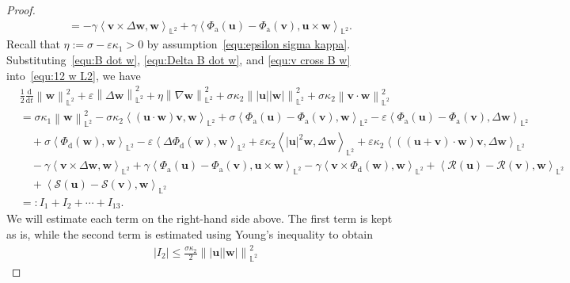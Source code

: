\documentclass[11pt, reqno]{amsart}
\theoremstyle{definition}
\numberwithin{equation}{section}
\newcommand{\bff}{\boldsymbol}
\newcommand{\bb}{\mathbb}
\newcommand{\ddt}{\frac{\mathrm{d}}{\mathrm{d}t}}
\newcommand{\norm}[2]{\left\|{#1}\right\|_{#2}}
\newcommand{\inpro}[2]{\left\langle#1,#2\right\rangle}
\newcommand{\abs}[1]{\left|{#1}\right|}
\begin{document}
\begin{proof}
\begin{align}
    &=
    -\gamma \inpro{\bff{v}\times \Delta \bff{w}}{\bff{w}}_{\bb{L}^2}
    +
    \gamma \inpro{\Phi_{\mathrm{a}}(\bff{u})-\Phi_{\mathrm{a}}(\bff{v})}{\bff{u}\times \bff{w}}_{\bb{L}^2}.
\end{align}
Recall that $\eta:=\sigma-\varepsilon\kappa_1>0$ by assumption~\eqref{equ:epsilon sigma kappa}. Substituting~\eqref{equ:B dot w}, \eqref{equ:Delta B dot w}, and \eqref{equ:v cross B w} into~\eqref{equ:12 w L2}, we have
\begin{align}\label{equ:I1 to I12}
    &\frac12 \ddt \norm{\bff{w}}{\bb{L}^2}^2
    +
    \varepsilon\norm{\Delta \bff{w}}{\bb{L}^2}^2
    +
    \eta \norm{\nabla \bff{w}}{\bb{L}^2}^2
    +
    \sigma \kappa_2 \norm{|\bff{u}||\bff{w}|}{\bb{L}^2}^2
    +
    \sigma \kappa_2 \norm{\bff{v}\cdot \bff{w}}{\bb{L}^2}^2
    \nonumber \\
    &=
    \sigma \kappa_1 \norm{\bff{w}}{\bb{L}^2}^2
    -
    \sigma\kappa_2 \inpro{(\bff{u}\cdot \bff{w})\bff{v}}{\bff{w}}_{\bb{L}^2}
    +
    \sigma \inpro{\Phi_{\mathrm{a}}(\bff{u})-\Phi_{\mathrm{a}}(\bff{v})}{\bff{w}}_{\bb{L}^2}
    -
    \varepsilon \inpro{\Phi_{\mathrm{a}}(\bff{u})-\Phi_{\mathrm{a}}(\bff{v})}{\Delta \bff{w}}_{\bb{L}^2}
    \nonumber \\
    &\quad
    +
    \sigma \inpro{\Phi_{\mathrm{d}}(\bff{w})}{\bff{w}}_{\bb{L}^2}
    -
    \varepsilon \inpro{\Delta \Phi_{\mathrm{d}}(\bff{w})}{\bff{w}}_{\bb{L}^2}
    +
    \varepsilon\kappa_2 \inpro{|\bff{u}|^2 \bff{w}}{\Delta \bff{w}}_{\bb{L}^2}
    +
    \varepsilon \kappa_2 \inpro{((\bff{u}+\bff{v})\cdot\bff{w})\bff{v}}{\Delta\bff{w}}_{\bb{L}^2}
    \nonumber \\
    &\quad
    -
    \gamma \inpro{\bff{v}\times \Delta \bff{w}}{\bff{w}}_{\bb{L}^2}
    +
    \gamma \inpro{\Phi_{\mathrm{a}}(\bff{u})-\Phi_{\mathrm{a}}(\bff{v})}{\bff{u}\times \bff{w}}_{\bb{L}^2}
    -
    \gamma \inpro{\bff{v}\times \Phi_{\mathrm{d}}(\bff{w})}{\bff{w}}_{\bb{L}^2}
    +
    \inpro{\mathcal{R}(\bff{u})-\mathcal{R}(\bff{v})}{\bff{w}}_{\bb{L}^2}
    \nonumber \\
    &\quad
    +
    \inpro{\mathcal{S}(\bff{u})-\mathcal{S}(\bff{v})}{\bff{w}}_{\bb{L}^2}
    \nonumber \\
    &=:
    I_1+I_2+\cdots+I_{13}.
\end{align}
We will estimate each term on the right-hand side above. The first term is kept as is, while the second term is estimated using Young's inequality to obtain
\begin{align*}
    \abs{I_2}
    \leq
    \frac{\sigma \kappa_2}{2} \norm{|\bff{u}||\bff{w}|}{\bb{L}^2}^2

\end{align*}
\end{proof}
\end{document}
